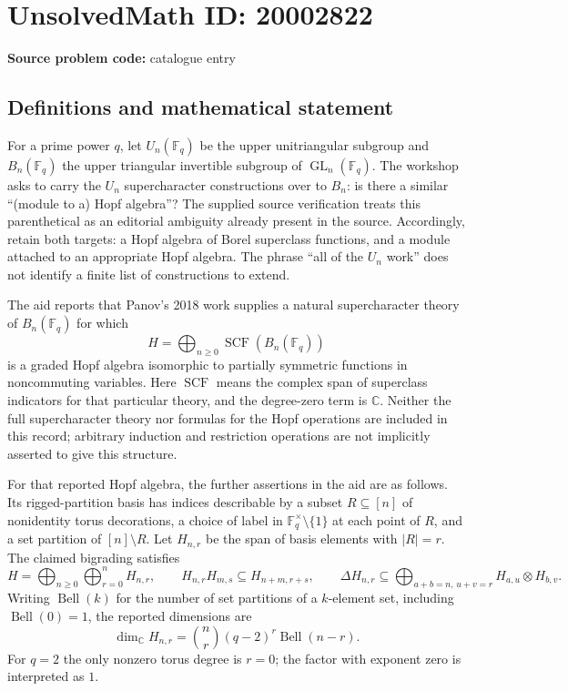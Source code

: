 \documentclass[11pt]{article}
\newcommand{\C}{\mathbb{C}}
\newcommand{\F}{\mathbb{F}}
\begin{document}
\section*{UnsolvedMath ID: 20002822}
\textbf{Source problem code:} catalogue entry
\subsection{Definitions and mathematical statement}
For a prime power $q$, let $U_n(\F_q)$ be the upper unitriangular subgroup and $B_n(\F_q)$ the upper triangular invertible subgroup of $\operatorname{GL}_n(\F_q)$. The workshop asks to carry the $U_n$ supercharacter constructions over to $B_n$: is there a similar ``(module to a) Hopf algebra''? The supplied source verification treats this parenthetical as an editorial ambiguity already present in the source. Accordingly, retain both targets: a Hopf algebra of Borel superclass functions, and a module attached to an appropriate Hopf algebra. The phrase ``all of the $U_n$ work'' does not identify a finite list of constructions to extend.

The aid reports that Panov's 2018 work supplies a natural supercharacter theory of $B_n(\F_q)$ for which
\[
H=\bigoplus_{n\geq0}\operatorname{SCF}(B_n(\F_q))
\]
is a graded Hopf algebra isomorphic to partially symmetric functions in noncommuting variables. Here $\operatorname{SCF}$ means the complex span of superclass indicators for that particular theory, and the degree-zero term is $\C$. Neither the full supercharacter theory nor formulas for the Hopf operations are included in this record; arbitrary induction and restriction operations are not implicitly asserted to give this structure.

For that reported Hopf algebra, the further assertions in the aid are as follows. Its rigged-partition basis has indices describable by a subset $R\subseteq[n]$ of nonidentity torus decorations, a choice of label in $\F_q^\times\setminus\{1\}$ at each point of $R$, and a set partition of $[n]\setminus R$. Let $H_{n,r}$ be the span of basis elements with $|R|=r$. The claimed bigrading satisfies
\[
H=\bigoplus_{n\geq0}\bigoplus_{r=0}^n H_{n,r},\qquad
H_{n,r}H_{m,s}\subseteq H_{n+m,r+s},\qquad
\Delta H_{n,r}\subseteq\bigoplus_{a+b=n,\,u+v=r}H_{a,u}\otimes H_{b,v}.
\]
Writing $\operatorname{Bell}(k)$ for the number of set partitions of a $k$-element set, including $\operatorname{Bell}(0)=1$, the reported dimensions are
\[
\dim_\C H_{n,r}=\binom nr(q-2)^r\operatorname{Bell}(n-r).
\]
For $q=2$ the only nonzero torus degree is $r=0$; the factor with exponent zero is interpreted as $1$.
\end{document}
